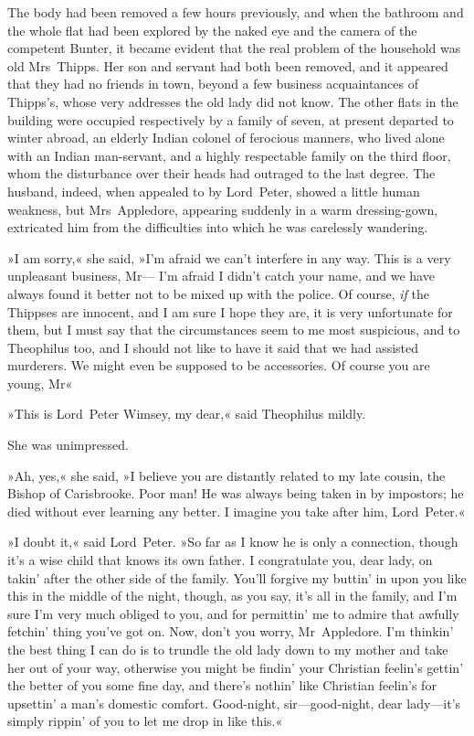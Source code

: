 The body had been removed a few hours previously, and when the bathroom and the whole flat had been explored by the naked eye and the camera of the competent Bunter, it became evident that the real problem of the household was old Mrs~Thipps. Her son and servant had both been removed, and it appeared that they had no friends in town, beyond a few business acquaintances of Thipps's, whose very addresses the old lady did not know. The other flats in the building were occupied respectively by a family of seven, at present departed to winter abroad, an elderly Indian colonel of ferocious manners, who lived alone with an Indian man-servant, and a highly respectable family on the third floor, whom the disturbance over their heads had outraged to the last degree. The husband, indeed, when appealed to by Lord~Peter, showed a little human weakness, but Mrs~Appledore, appearing suddenly in a warm dressing-gown, extricated him from the difficulties into which he was carelessly wandering.

»I am sorry,« she said, »I'm afraid we can't interfere in any way. This is a very unpleasant business, Mr— I'm afraid I didn't catch your name, and we have always found it better not to be mixed up with the police. Of course, \textit{if} the Thippses are innocent, and I am sure I hope they are, it is very unfortunate for them, but I must say that the circumstances seem to me most suspicious, and to Theophilus too, and I should not like to have it said that we had assisted murderers. We might even be supposed to be accessories. Of course you are young, Mr\longdash«

»This is Lord~Peter Wimsey, my dear,« said Theophilus mildly.

She was unimpressed.

»Ah, yes,« she said, »I believe you are distantly related to my late cousin, the Bishop of Carisbrooke. Poor man! He was always being taken in by impostors; he died without ever learning any better. I imagine you take after him, Lord~Peter.«

»I doubt it,« said Lord~Peter. »So far as I know he is only a connection, though it's a wise child that knows its own father. I congratulate you, dear lady, on takin' after the other side of the family. You'll forgive my buttin' in upon you like this in the middle of the night, though, as you say, it's all in the family, and I'm sure I'm very much obliged to you, and for permittin' me to admire that awfully fetchin' thing you've got on. Now, don't you worry, Mr~Appledore. I'm thinkin' the best thing I can do is to trundle the old lady down to my mother and take her out of your way, otherwise you might be findin' your Christian feelin's gettin' the better of you some fine day, and there's nothin' like Christian feelin's for upsettin' a man's domestic comfort. Good-night, sir—good-night, dear lady—it's simply rippin' of you to let me drop in like this.«

